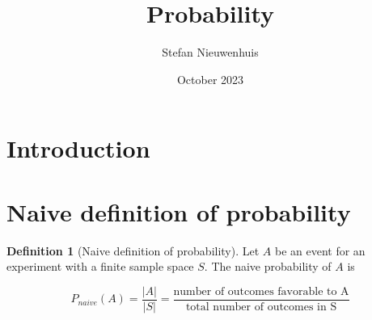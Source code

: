 \documentclass[a4paper]{article}
\title{Probability}
\author{Stefan Nieuwenhuis}
\date{October 2023}
\newcommand*\textfrac[2]{
  \frac{\text{#1}}{\text{#2}}
}
\theoremstyle{definition}
\newtheorem{definition}{Definition}[section]
\begin{document}
\maketitle

\section{Introduction}

\section{Naive definition of probability}

\begin{definition}[Naive definition of probability]
Let $A$ be an event for an experiment with a finite sample space $S$. The naive probability of $A$ is

$$P_{naive}(A)=\frac{|A|}{|S|}=\textfrac{number of outcomes favorable to A}{total number of outcomes in S}$$
\end{definition}
\end{document}
